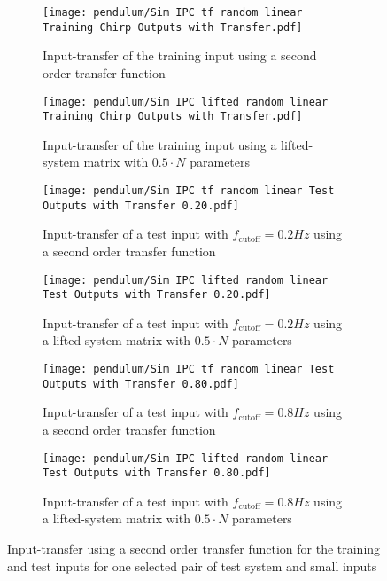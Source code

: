 \begin{figure}
    \centering
    \begin{subfigure}[t]{0.495\textwidth}
        \centering
        \texttt{[image: pendulum/Sim IPC tf random linear Training Chirp Outputs with Transfer.pdf]}
        \caption{Input-transfer of the training input using a second order transfer function}
    \end{subfigure}
    \hfill
    \begin{subfigure}[t]{0.495\textwidth}
        \centering
        \texttt{[image: pendulum/Sim IPC lifted random linear Training Chirp Outputs with Transfer.pdf]}
        \caption{Input-transfer of the training input using a lifted-system matrix with $0.5\cdot N$ parameters}
    \end{subfigure}
    \hfill
    \medskip
    \begin{subfigure}[t]{0.495\textwidth}
        \centering
        \texttt{[image: pendulum/Sim IPC tf random linear Test Outputs with Transfer 0.20.pdf]}
        \caption{Input-transfer of a test input with $f_{\mathrm{cutoff}}=0.2\unit{Hz}$ using a second order transfer function}
    \end{subfigure}
    \hfill
    \begin{subfigure}[t]{0.495\textwidth}
        \centering
        \texttt{[image: pendulum/Sim IPC lifted random linear Test Outputs with Transfer 0.20.pdf]}
        \caption{Input-transfer of a test input with $f_{\mathrm{cutoff}}=0.2\unit{Hz}$  using a lifted-system matrix with $0.5\cdot N$ parameters}
    \end{subfigure}
    \hfill
    \medskip
    \begin{subfigure}[t]{0.495\textwidth}
        \centering
        \texttt{[image: pendulum/Sim IPC tf random linear Test Outputs with Transfer 0.80.pdf]}
        \caption{Input-transfer of a test input with $f_{\mathrm{cutoff}}=0.8\unit{Hz}$ using a second order transfer function}
    \end{subfigure}
    \hfill
    \begin{subfigure}[t]{0.495\textwidth}
        \centering
        \texttt{[image: pendulum/Sim IPC lifted random linear Test Outputs with Transfer 0.80.pdf]}
        \caption{Input-transfer of a test input with $f_{\mathrm{cutoff}}=0.8\unit{Hz}$  using a lifted-system matrix with $0.5\cdot N$ parameters}
    \end{subfigure}
    \caption[IPC -- Output Error Trajectories with Input Transfer (Low Amplitude)]{Input-transfer using a second order transfer function for the training and test inputs for one selected pair of test system and small inputs}
    \label{fig:sim2_example_outputs}
\end{figure}
	


